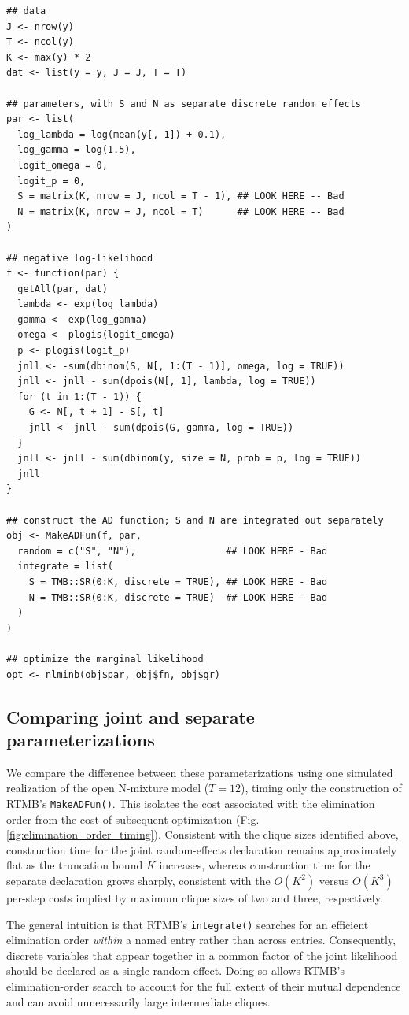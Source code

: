 \documentclass[11pt]{article}
\begin{document}
\begin{verbatim}
## data
J <- nrow(y)
T <- ncol(y)
K <- max(y) * 2
dat <- list(y = y, J = J, T = T)

## parameters, with S and N as separate discrete random effects
par <- list(
  log_lambda = log(mean(y[, 1]) + 0.1),
  log_gamma = log(1.5),
  logit_omega = 0,
  logit_p = 0,
  S = matrix(K, nrow = J, ncol = T - 1), ## LOOK HERE -- Bad
  N = matrix(K, nrow = J, ncol = T)      ## LOOK HERE -- Bad
)

## negative log-likelihood
f <- function(par) {
  getAll(par, dat)
  lambda <- exp(log_lambda)
  gamma <- exp(log_gamma)
  omega <- plogis(logit_omega)
  p <- plogis(logit_p)
  jnll <- -sum(dbinom(S, N[, 1:(T - 1)], omega, log = TRUE))
  jnll <- jnll - sum(dpois(N[, 1], lambda, log = TRUE))
  for (t in 1:(T - 1)) {
    G <- N[, t + 1] - S[, t]
    jnll <- jnll - sum(dpois(G, gamma, log = TRUE))
  }
  jnll <- jnll - sum(dbinom(y, size = N, prob = p, log = TRUE))
  jnll
}

## construct the AD function; S and N are integrated out separately
obj <- MakeADFun(f, par,
  random = c("S", "N"),                ## LOOK HERE - Bad
  integrate = list(
    S = TMB::SR(0:K, discrete = TRUE), ## LOOK HERE - Bad
    N = TMB::SR(0:K, discrete = TRUE)  ## LOOK HERE - Bad
  )
)

## optimize the marginal likelihood
opt <- nlminb(obj$par, obj$fn, obj$gr)
\end{verbatim}

\subsection{Comparing joint and separate parameterizations}

We compare the difference between these parameterizations using one simulated realization of the open N-mixture model ($T=12$), timing only the construction of RTMB's \texttt{MakeADFun()}. This isolates the cost associated with the elimination order from the cost of subsequent optimization (Fig. \ref{fig:elimination_order_timing}). Consistent with the clique sizes identified above, construction time for the joint random-effects declaration remains approximately flat as the truncation bound $K$ increases, whereas construction time for the separate declaration grows sharply, consistent with the $O(K^2)$ versus $O(K^3)$ per-step costs implied by maximum clique sizes of two and three, respectively.

The general intuition is that RTMB's \texttt{integrate()} searches for an efficient elimination order \emph{within} a named entry rather than across entries. Consequently, discrete variables that appear together in a common factor of the joint likelihood should be declared as a single random effect. Doing so allows RTMB's elimination-order search to account for the full extent of their mutual dependence and can avoid unnecessarily large intermediate cliques.
\end{document}
